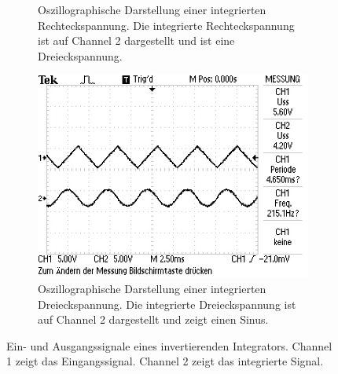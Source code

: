 \begin{figure}
\begin{subfigure}[b]{0.45\textwidth}
        \caption{Oszillographische Darstellung einer integrierten Rechteckspannung.
        Die integrierte Rechteckspannung ist auf Channel 2 dargestellt und ist eine Dreieckspannung.}
        \label{fig:int_recht}
    \end{subfigure}
    \newline
    \newline  
    \newline
    \newline  
    \newline  
    \begin{subfigure}{0.45\textwidth}
        \centering
        \includegraphics[width=\textwidth]{data_of_others_cuz_ours_suck/int/int_dreieck.JPG}
        \caption{Oszillographische Darstellung einer integrierten Dreieckspannung.
        Die integrierte Dreieckspannung ist auf Channel 2 dargestellt und zeigt einen Sinus.}
        \label{fig:int_drei}
    \end{subfigure}
       \caption{Ein- und Ausgangssignale eines invertierenden Integrators. Channel 1 zeigt
       das Eingangssignal. Channel 2 zeigt das integrierte Signal.}
       \label{fig:int}
\end{figure}
\FloatBarrier


